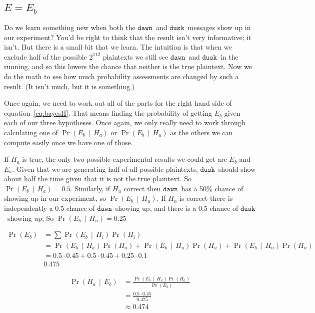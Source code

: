 \documentclass{article}
\newcommand{\prob}[1]{\ensuremath{\operatorname{Pr}\left( #1 \right)}}
\newcommand{\condprob}[2]{\prob{#1\, \middle|\, #2}}
\newcommand\mdusk{\ensuremath{\mathtt{dusk}}}
\newcommand\mdawn{\ensuremath{\mathtt{dawn}}}
\begin{document}
\subsection{\(E = E_b\)}

Do we learn something new when both the \mdawn\ and \mdusk\ messages show up in our experiment? You'd be right to think that the result isn't very informative; it isn't. But there is a small bit that we learn.
The intuition is that when we exclude half of the possible $2^112$ plaintexts we still see \mdawn\ and \mdusk\ in the running, and so this lowers the chance that neither is the true plaintext. Now we do the math to see how much probability assessments are changed by such a result. (It isn't much, but it is something.)

Once again, we need to work out all of the parts for the right hand side of equation~\ref{eq:bayesH}. That means finding the probability of getting $E_b$ given each of our three hypotheses. Once again, we only really need to work through calculating one of \condprob{E_b}{H_a} or \condprob{E_b}{H_u} as the others we can compute easily once we have one of those.

If $H_a$ is true, the only two possible experimental results we could get are  $E_b$ and $E_a$. Given that we are generating half of all possible plaintexts, \mdusk\ should show about half the time given that it is not the true plaintext. So $\condprob{E_b}{H_a} = 0.5$.
Similarly, if $H_u$ correct then \mdawn\ has a 50\% chance of showing up in our experiment, so \condprob{E_b}{H_u}.
If $H_n$ is correct there is independently a 0.5 chance of \mdawn\ showing up, and there is a 0.5 chance of \mdusk\ showing up;
So $\condprob{E_b}{H_n} = 0.25$

\begin{equation}
    \begin{split}
        \prob{E_b}  &= \sum \condprob{E_b}{H_i}\prob{H_i} \\
                    &= \condprob{E_b}{H_a}\prob{H_a}
                        + \condprob{E_b}{H_u}\prob{H_u}
                        + \condprob{E_b}{H_n}\prob{H_n} \\
                    &= 0.5 \cdot 0.45 + 0.5 \cdot 0.45 + 0.25 \cdot 0.1 \\
                    & 0.475
    \end{split}
\end{equation}

\begin{equation}
    \begin{split}
        \condprob{H_a}{E_b}
            &= \frac{\condprob{E_b}{H_a}\prob{H_a}}{\prob{E_b}} \\
            &= \frac{0.5 \cdot 0.45}{0.475} \\
            &\approx 0.474
    \end{split}
\end{equation}
\end{document}
